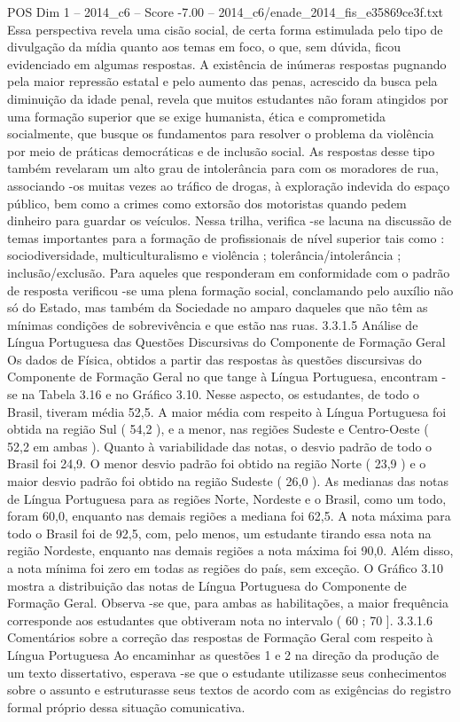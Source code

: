 \begin{textsample}{POS Dim 1 – 2014\_c6 – Score -7.00 – 2014\_c6/enade\_2014\_fis\_e35869ce3f.txt}
Essa perspectiva revela uma cisão social, de certa forma estimulada pelo tipo de divulgação da mídia quanto aos temas em foco, o que, sem dúvida, ficou evidenciado em algumas respostas.
A existência de inúmeras respostas pugnando pela maior repressão estatal e pelo aumento das penas, acrescido da busca pela diminuição da idade penal, revela que muitos estudantes não foram atingidos por uma formação superior que se exige humanista, ética e comprometida socialmente, que busque os fundamentos para resolver o problema da violência por meio de práticas democráticas e de inclusão social.
As respostas desse tipo também revelaram um alto grau de intolerância para com os moradores de rua, associando -os muitas vezes ao tráfico de drogas, à exploração indevida do espaço público, bem como a crimes como extorsão dos motoristas quando pedem dinheiro para guardar os veículos.
Nessa trilha, verifica -se lacuna na discussão de temas importantes para a formação de profissionais de nível superior tais como : sociodiversidade, multiculturalismo e violência ; tolerância/intolerância ; inclusão/exclusão.
Para aqueles que responderam em conformidade com o padrão de resposta verificou -se uma plena formação social, conclamando pelo auxílio não só do Estado, mas também da Sociedade no amparo daqueles que não têm as mínimas condições de sobrevivência e que estão nas ruas. 3.3.1.5 Análise de Língua Portuguesa das Questões Discursivas do Componente de Formação Geral Os dados de Física, obtidos a partir das respostas às questões discursivas do Componente de Formação Geral no que tange à Língua Portuguesa, encontram -se na Tabela 3.16 e no Gráfico 3.10.
Nesse aspecto, os estudantes, de todo o Brasil, tiveram média 52,5.
A maior média com respeito à Língua Portuguesa foi obtida na região Sul ( 54,2 ), e a menor, nas regiões Sudeste e Centro-Oeste ( 52,2 em ambas ).
Quanto à variabilidade das notas, o desvio padrão de todo o Brasil foi 24,9.
O menor desvio padrão foi obtido na região Norte ( 23,9 ) e o maior desvio padrão foi obtido na região Sudeste ( 26,0 ).
As medianas das notas de Língua Portuguesa para as regiões Norte, Nordeste e o Brasil, como um todo, foram 60,0, enquanto nas demais regiões a mediana foi 62,5.
A nota máxima para todo o Brasil foi de 92,5, com, pelo menos, um estudante tirando essa nota na região Nordeste, enquanto nas demais regiões a nota máxima foi 90,0.
Além disso, a nota mínima foi zero em todas as regiões do país, sem exceção.
O Gráfico 3.10 mostra a distribuição das notas de Língua Portuguesa do Componente de Formação Geral.
Observa -se que, para ambas as habilitações, a maior frequência corresponde aos estudantes que obtiveram nota no intervalo ( 60 ; 70 ]. 3.3.1.6 Comentários sobre a correção das respostas de Formação Geral com respeito à Língua Portuguesa Ao encaminhar as questões 1 e 2 na direção da produção de um texto dissertativo, esperava -se que o estudante utilizasse seus conhecimentos sobre o assunto e estruturasse seus textos de acordo com as exigências do registro formal próprio dessa situação comunicativa.

\end{textsample}
